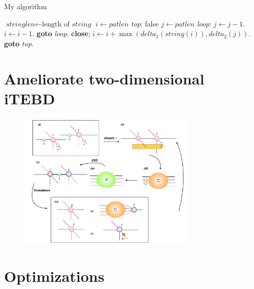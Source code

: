 \begin{algorithm}
	\caption{My algorithm}\label{euclid}
	\begin{algorithmic}[1]
		\State $\textit{stringlen} \gets \text{length of }\textit{string}$
		\State $i \gets \textit{patlen}$
		\BState \emph{top}:
		 \Return false
		\EndIf
		\State $j \gets \textit{patlen}$
		\BState \emph{loop}:
		\State $j \gets j-1$.
		\State $i \gets i-1$.
		\State \textbf{goto} \emph{loop}.
		\State \textbf{close};
		\EndIf
		\State $i \gets i+\max(\textit{delta}_1(\textit{string}(i)),\textit{delta}_2(j))$.
		\State \textbf{goto} \emph{top}.
		\EndProcedure
	\end{algorithmic}
\end{algorithm}

\section{Ameliorate two-dimensional iTEBD}
\label{2dhastin}

	\begin{figure}[ht]
	\centering
	\includegraphics[width=0.75\textwidth]{figures/fig316.png}
	\caption[The tensor network diagrams for the 2-D iTEBD which is ameliorated by Hestins]{}
	\label{fig316}
	\end{figure}

\section{Optimizations}
\label{2dopt}

